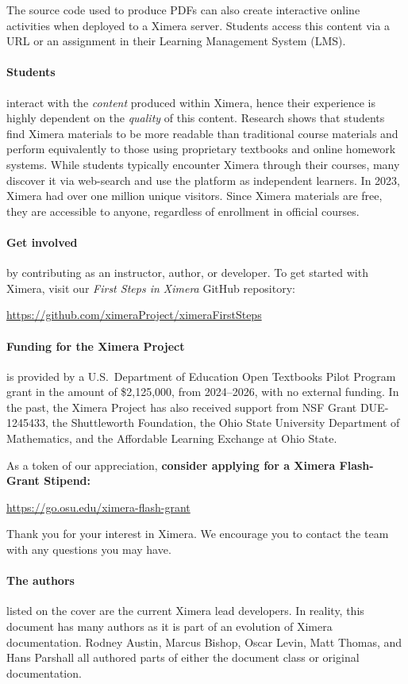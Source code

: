 \documentclass{ximera}
\begin{document}
The source code used to produce PDFs can also create interactive online
activities when deployed to a Ximera server. Students access this content via a
URL or an assignment in their Learning Management System (LMS).


\paragraph{Students} interact with the \textit{content} produced within
Ximera, hence their experience is highly dependent on the \textit{quality} of this
content. Research shows that students find Ximera materials to be more readable
than traditional course materials and perform equivalently to those using
proprietary textbooks and online homework systems. While students typically
encounter Ximera through their courses, many discover it via web-search and
use the platform as independent learners. In 2023, Ximera had over one million
unique visitors. Since Ximera materials are free, they are accessible to
anyone, regardless of enrollment in official courses.




\paragraph{Get involved} by contributing as an instructor, author,
or developer. To get started with Ximera, visit our
\textit{First Steps in Ximera} GitHub repository:
\begin{center}
    \url{https://github.com/ximeraProject/ximeraFirstSteps}
\end{center}


\paragraph{Funding for the Ximera Project} is provided by
a U.S.\ Department of Education Open Textbooks Pilot Program grant in the
amount of \$2,125,000, from 2024--2026, with no external funding.
In the past, the Ximera Project has
also received support from NSF Grant DUE-1245433, the Shuttleworth
Foundation, the Ohio State University
Department of Mathematics, and the Affordable Learning Exchange at Ohio State.

As a token of our appreciation, \textbf{consider applying for a Ximera
    Flash-Grant Stipend:}
\begin{center}
    \url{https://go.osu.edu/ximera-flash-grant}
\end{center}
Thank you for your interest in Ximera. We encourage you to contact the
team with any questions you may have.

\paragraph{The authors} listed on the cover are the current Ximera lead
developers. In reality, this document has many authors as it is part of an
evolution of Ximera documentation. Rodney Austin, Marcus Bishop, Oscar Levin, Matt Thomas, and Hans
Parshall all  authored parts of either the document class or original
documentation.
\end{document}

